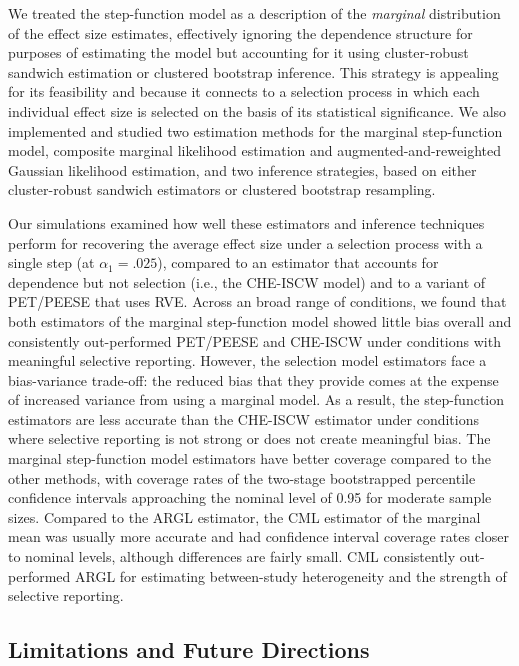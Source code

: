 \documentclass[
  american,
  man, donotrepeattitle,floatsintext]{apa7}
\begin{document}
We treated the step-function model as a description of the \emph{marginal} distribution of the effect size estimates, effectively ignoring the dependence structure for purposes of estimating the model but accounting for it using cluster-robust sandwich estimation or clustered bootstrap inference.
This strategy is appealing for its feasibility and because it connects to a selection process in which each individual effect size is selected on the basis of its statistical significance.
We also implemented and studied two estimation methods for the marginal step-function model, composite marginal likelihood estimation and augmented-and-reweighted Gaussian likelihood estimation, and two inference strategies, based on either cluster-robust sandwich estimators or clustered bootstrap resampling.

Our simulations examined how well these estimators and inference techniques perform for recovering the average effect size under a selection process with a single step (at \(\alpha_1 = .025\)), compared to an estimator that accounts for dependence but not selection (i.e., the CHE-ISCW model) and to a variant of PET/PEESE that uses RVE.
Across an broad range of conditions, we found that both estimators of the marginal step-function model showed little bias overall and consistently out-performed PET/PEESE and CHE-ISCW under conditions with meaningful selective reporting.
However, the selection model estimators face a bias-variance trade-off:
the reduced bias that they provide comes at the expense of increased variance from using a marginal model. As a result, the step-function estimators are less accurate than the CHE-ISCW estimator under conditions where selective reporting is not strong or does not create meaningful bias.
The marginal step-function model estimators have better coverage compared to the other methods, with coverage rates of the two-stage bootstrapped percentile confidence intervals approaching the nominal level of 0.95 for moderate sample sizes.
Compared to the ARGL estimator, the CML estimator of the marginal mean was usually more accurate and had confidence interval coverage rates closer to nominal levels, although differences are fairly small.
CML consistently out-performed ARGL for estimating between-study heterogeneity and the strength of selective reporting.

\subsection{Limitations and Future Directions}\label{limitations-and-future-directions}
\end{document}
